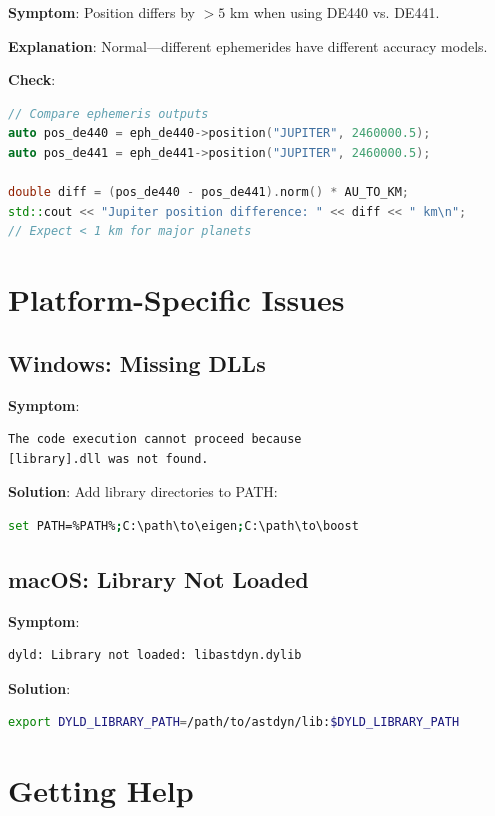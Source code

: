 \textbf{Symptom}: Position differs by $> 5$ km when using DE440 vs. DE441.

\textbf{Explanation}: Normal—different ephemerides have different accuracy models.

\textbf{Check}:
\begin{lstlisting}[language=C++]
// Compare ephemeris outputs
auto pos_de440 = eph_de440->position("JUPITER", 2460000.5);
auto pos_de441 = eph_de441->position("JUPITER", 2460000.5);

double diff = (pos_de440 - pos_de441).norm() * AU_TO_KM;
std::cout << "Jupiter position difference: " << diff << " km\n";
// Expect < 1 km for major planets
\end{lstlisting}

\section{Platform-Specific Issues}

\subsection{Windows: Missing DLLs}

\textbf{Symptom}:
\begin{lstlisting}[style=output]
The code execution cannot proceed because
[library].dll was not found.
\end{lstlisting}

\textbf{Solution}: Add library directories to PATH:
\begin{lstlisting}[language=bash]
set PATH=%PATH%;C:\path\to\eigen;C:\path\to\boost
\end{lstlisting}

\subsection{macOS: Library Not Loaded}

\textbf{Symptom}:
\begin{lstlisting}[style=output]
dyld: Library not loaded: libastdyn.dylib
\end{lstlisting}

\textbf{Solution}:
\begin{lstlisting}[language=bash]
export DYLD_LIBRARY_PATH=/path/to/astdyn/lib:$DYLD_LIBRARY_PATH
\end{lstlisting}

\section{Getting Help}

